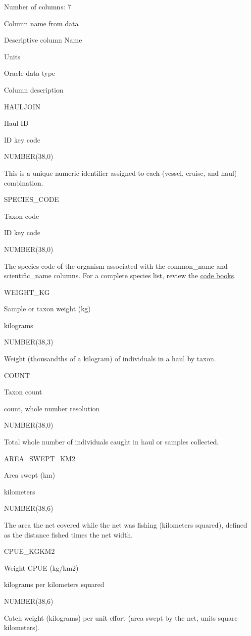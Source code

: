 \documentclass[
  letterpaper,
  oneside,
  open=any]{scrbook}
\begin{document}
Number of columns: 7

Column name from data

Descriptive column Name

Units

Oracle data type

Column description

HAULJOIN

Haul ID

ID key code

NUMBER(38,0)

This is a unique numeric identifier assigned to each (vessel, cruise,
and haul) combination.

SPECIES\_CODE

Taxon code

ID key code

NUMBER(38,0)

The species code of the organism associated with the common\_name and
scientific\_name columns. For a complete species list, review the
\href{https://www.fisheries.noaa.gov/resource/document/groundfish-survey-species-code-manual-and-data-codes-manual}{code
books}.

WEIGHT\_KG

Sample or taxon weight (kg)

kilograms

NUMBER(38,3)

Weight (thousandths of a kilogram) of individuals in a haul by taxon.

COUNT

Taxon count

count, whole number resolution

NUMBER(38,0)

Total whole number of individuals caught in haul or samples collected.

AREA\_SWEPT\_KM2

Area swept (km)

kilometers

NUMBER(38,6)

The area the net covered while the net was fishing (kilometers squared),
defined as the distance fished times the net width.

CPUE\_KGKM2

Weight CPUE (kg/km2)

kilograms per kilometers squared

NUMBER(38,6)

Catch weight (kilograms) per unit effort (area swept by the net, units
square kilometers).
\end{document}
